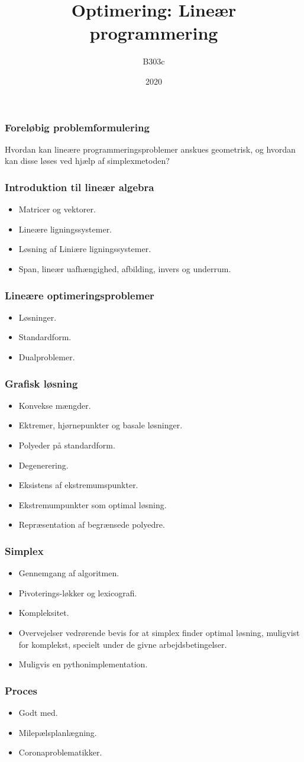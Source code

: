 \documentclass{beamer}
\title{Optimering: Lineær programmering}
\author{B303c}
\institute{Aalborg Universitet}
\date{2020}
\begin{document}
\frame{\titlepage}


\begin{frame}
\frametitle{Foreløbig problemformulering}
Hvordan kan lineære programmeringsproblemer anskues geometrisk, og hvordan kan disse løses ved hjælp af simplexmetoden?
\end{frame}
\begin{frame}
\frametitle{Introduktion til lineær algebra}
\begin{itemize}
\item Matricer og vektorer.
\item Lineære ligningssystemer.
\item Løsning af Liniære ligningssystemer.
\item Span, lineær uafhængighed, afbilding, invers og underrum.
\end{itemize}
\end{frame}


\begin{frame}
\frametitle{Lineære optimeringsproblemer}
\begin{itemize}
\item Løsninger.
\item Standardform.
\item Dualproblemer.
\end{itemize}
\end{frame}


\begin{frame}
\frametitle{Grafisk løsning}
\begin{itemize}
\item Konvekse mængder.
\item Ektremer, hjørnepunkter og basale løsninger.
\item Polyeder på standardform.
\item Degenerering.
\item Eksistens af ekstremumspunkter. %
\item Ekstremumpunkter som optimal løsning.
\item Repræsentation af begrænsede polyedre.
\end{itemize}
\end{frame}

\begin{frame}
\frametitle{Simplex}
\begin{itemize}
\item Gennemgang af algoritmen.
\item Pivoterings-løkker og lexicografi.
\item Kompleksitet.
\item Overvejelser vedrørende bevis for at simplex finder optimal løsning, muligvist for komplekst, specielt under de givne arbejdsbetingelser.
\item Muligvis en pythonimplementation.
\end{itemize}
\end{frame}


\begin{frame}
\frametitle{Proces}
\begin{itemize}
\item Godt med.
\item Milepælsplanlægning.
\item Coronaproblematikker.
\end{itemize}
\end{frame}
\end{document}
